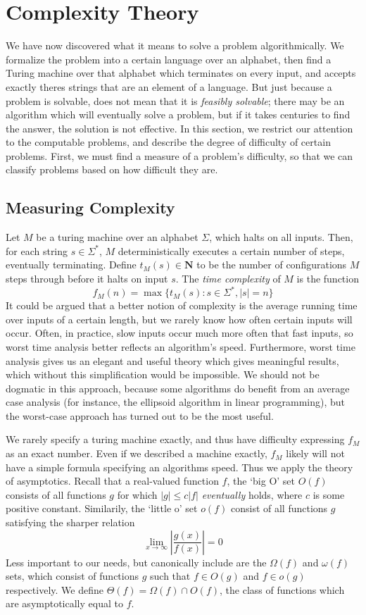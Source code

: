 \chapter{Complexity Theory}

We have now discovered what it means to solve a problem algorithmically. We formalize the problem into a certain language over an alphabet, then find a Turing machine over that alphabet which terminates on every input, and accepts exactly theres strings that are an element of a language. But just because a problem is solvable, does not mean that it is {\it feasibly solvable}; there may be an algorithm which will eventually solve a problem, but if it takes centuries to find the answer, the solution is not effective. In this section, we restrict our attention to the computable problems, and describe the degree of difficulty of certain problems. First, we must find a measure of a problem's difficulty, so that we can classify problems based on how difficult they are.

\section{Measuring Complexity}

Let $M$ be a turing machine over an alphabet $\Sigma$, which halts on all inputs. Then, for each string $s \in \Sigma^*$, $M$ deterministically executes a certain number of steps, eventually terminating. Define $t_M(s) \in \mathbf{N}$ to be the number of configurations $M$ steps through before it halts on input $s$. The \emph{time complexity} of $M$ is the function
%
\[ f_M(n) = \max \{ t_M(s): s \in \Sigma^*, |s| = n \} \]
%
It could be argued that a better notion of complexity is the average running time over inputs of a certain length, but we rarely know how often certain inputs will occur. Often, in practice, slow inputs occur much more often that fast inputs, so worst time analysis better reflects an algorithm's speed. Furthermore, worst time analysis gives us an elegant and useful theory which gives meaningful results, which without this simplification would be impossible. We should not be dogmatic in this approach, because some algorithms do benefit from an average case analysis (for instance, the ellipsoid algorithm in linear programming), but the worst-case approach has turned out to be the most useful.

We rarely specify a turing machine exactly, and thus have difficulty expressing $f_M$ as an exact number. Even if we described a machine exactly, $f_M$ likely will not have a simple formula specifying an algorithms speed. Thus we apply the theory of asymptotics. Recall that a real-valued function $f$, the `big O' set $O(f)$ consists of all functions $g$ for which $|g| \leq c|f|$ {\it eventually} holds, where $c$ is some positive constant. Similarily, the `little o' set $o(f)$ consist of all functions $g$ satisfying the sharper relation
%
\[ \lim_{x \to \infty} \left|\frac{g(x)}{f(x)}\right| = 0 \]
%
Less important to our needs, but canonically include are the $\Omega(f)$ and $\omega(f)$ sets, which consist of functions $g$ such that $f \in O(g)$ and $f \in o(g)$ respectively. We define $\Theta(f) = \Omega(f) \cap O(f)$, the class of functions which are asymptotically equal to $f$.

